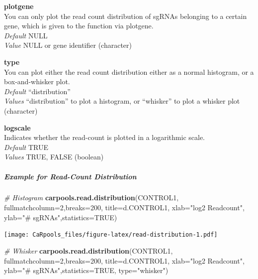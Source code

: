 \documentclass[]{article}
\newenvironment{Shaded}{\begin{snugshade}}{\end{snugshade}}
\newcommand{\KeywordTok}[1]{\textcolor[rgb]{0.13,0.29,0.53}{\textbf{{#1}}}}
\newcommand{\DataTypeTok}[1]{\textcolor[rgb]{0.13,0.29,0.53}{{#1}}}
\newcommand{\DecValTok}[1]{\textcolor[rgb]{0.00,0.00,0.81}{{#1}}}
\newcommand{\StringTok}[1]{\textcolor[rgb]{0.31,0.60,0.02}{{#1}}}
\newcommand{\CommentTok}[1]{\textcolor[rgb]{0.56,0.35,0.01}{\textit{{#1}}}}
\newcommand{\OtherTok}[1]{\textcolor[rgb]{0.56,0.35,0.01}{{#1}}}
\newcommand{\NormalTok}[1]{{#1}}
\let\oldsubparagraph\subparagraph
\renewcommand{\subparagraph}[1]{\oldsubparagraph{#1}\mbox{}}
\begin{document}
\textbf{plotgene}\\
You can only plot the read count distribution of sgRNAs belonging to a
certain gene, which is given to the function via plotgene.\\
\emph{Default} NULL\\
\emph{Value} NULL or gene identifier (character)

\textbf{type}\\
You can plot either the read count distribution either as a normal
histogram, or a box-and-whisker plot.\\
\emph{Default} ``distribution''\\
\emph{Values} ``distribution'' to plot a histogram, or ``whisker'' to
plot a whisker plot (character)

\textbf{logscale}\\
Indicates whether the read-count is plotted in a logarithmic scale.\\
\emph{Default} TRUE\\
\emph{Values} TRUE, FALSE (boolean)

\subparagraph{Example for Read-Count
Distribution}\label{example-for-read-count-distribution}

\begin{Shaded}
\begin{Highlighting}[]
\CommentTok{# Histogram}
\KeywordTok{carpools.read.distribution}\NormalTok{(CONTROL1, }\DataTypeTok{fullmatchcolumn=}\DecValTok{2}\NormalTok{,}\DataTypeTok{breaks=}\DecValTok{200}\NormalTok{,}
  \DataTypeTok{title=}\NormalTok{d.CONTROL1, }\DataTypeTok{xlab=}\StringTok{"log2 Readcount"}\NormalTok{, }\DataTypeTok{ylab=}\StringTok{"# sgRNAs"}\NormalTok{,}\DataTypeTok{statistics=}\OtherTok{TRUE}\NormalTok{) }
\end{Highlighting}
\end{Shaded}

\texttt{[image: CaRpools\_files/figure-latex/read-distribution-1.pdf]}

\begin{Shaded}
\begin{Highlighting}[]
\CommentTok{# Whisker}
\KeywordTok{carpools.read.distribution}\NormalTok{(CONTROL1, }\DataTypeTok{fullmatchcolumn=}\DecValTok{2}\NormalTok{,}\DataTypeTok{breaks=}\DecValTok{200}\NormalTok{,}
  \DataTypeTok{title=}\NormalTok{d.CONTROL1, }\DataTypeTok{xlab=}\StringTok{"log2 Readcount"}\NormalTok{, }\DataTypeTok{ylab=}\StringTok{"# sgRNAs"}\NormalTok{,}\DataTypeTok{statistics=}\OtherTok{TRUE}\NormalTok{,}
  \DataTypeTok{type=}\StringTok{"whisker"}\NormalTok{) }
\end{Highlighting}
\end{Shaded}
\end{document}

